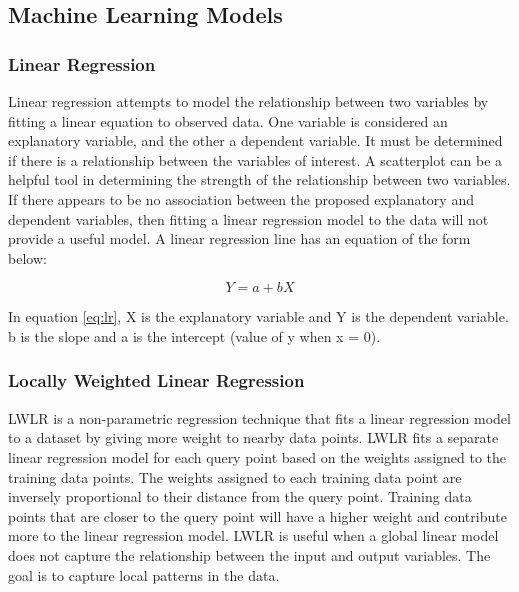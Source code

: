 \documentclass[conference]{IEEEtran}
\begin{document}
\subsection{Machine Learning Models} \label{sec:models}

\subsubsection{Linear Regression}
Linear regression attempts to model the relationship between two variables by fitting a linear equation to observed data.
One variable is considered an explanatory variable, and the other a dependent variable.
It must be determined if there is a relationship between the variables of interest.
A scatterplot can be a helpful tool in determining the strength of the relationship between two variables.
If there appears to be no association between the proposed explanatory and dependent variables, then fitting a linear regression model to the data will not provide a useful model.
A linear regression line has an equation of the form below:

\begin{equation} \label{eq:lr}
    Y = a + bX
\end{equation}

In equation \ref{eq:lr}, X is the explanatory variable and Y is the dependent variable.
b is the slope and a is the intercept (value of y when x = 0).

\subsubsection{Locally Weighted Linear Regression}
LWLR is a non-parametric regression technique that fits a linear regression model to a dataset by giving more weight to nearby data points.
LWLR fits a separate linear regression model for each query point based on the weights assigned to the training data points.
The weights assigned to each training data point are inversely proportional to their distance from the query point.
Training data points that are closer to the query point will have a higher weight and contribute more to the linear regression model.
LWLR is useful when a global linear model does not capture the relationship between the input and output variables.
The goal is to capture local patterns in the data.
\end{document}
